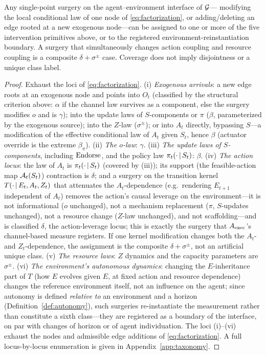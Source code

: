 \begin{proposition}
\label{thm:taxonomy-completeness}
Any single-point surgery on the agent--environment interface of $\mathcal{G}$---
modifying the local conditional law of one node of \eqref{eq:factorization},
or adding/deleting an edge rooted at a new exogenous node---can be assigned
to one or more of the five intervention primitives above, or to the
registered environment-reinstantiation boundary. A surgery that
simultaneously changes action coupling and resource coupling is a composite
$\delta+\sigma^{\pm}$ case. Coverage does not imply disjointness or a unique
class label.
\end{proposition}
\begin{proof}[Proof]
Exhaust the loci of \eqref{eq:factorization}. (i) \emph{Exogenous arrivals}: a
new edge roots at an exogenous node and points into $O_t$ (classified by the
structural criterion above: $\alpha$ if the channel law survives as a
component, else the surgery modifies $o$ and is $\gamma$); into the update
laws of $S$-components or $\pi$ ($\beta$, parameterized by the exogenous
source); into the $Z$-law ($\sigma^{\pm}$); or into $A_t$ directly, bypassing
$S$---a modification of the effective conditional law of $A_t$ given $S_t$,
hence $\beta$ (actuator override is the extreme $\beta_\pi$). (ii) \emph{The
$o$-law}: $\gamma$. (iii) \emph{The update laws of $S$-components},
including $\mathrm{Endorse}$, and the policy law $\pi_t(\cdot\,|\, S_t)$: $\beta$.
(iv) \emph{The action locus}: the law of $A_t$ is $\pi_t(\cdot\,|\, S_t)$
(covered by (iii)); its support (the feasible-action map
$\mathcal{A}_t(S_t)$) contraction is $\delta$; and a surgery on the transition
kernel $T(\cdot\,|\, E_t,A_t,Z_t)$ that attenuates the $A_t$-dependence
(e.g.\ rendering $E_{t+1}$ independent of $A_t$) removes the action's causal
leverage on the environment---it is not informational ($o$ unchanged), not a
mechanism replacement ($\pi$, $S$-updates unchanged), not a resource change
($Z$-law unchanged), and not scaffolding---and is classified $\delta$, the
action-leverage locus; this is exactly the surgery that $A_{\mathrm{exec}}$'s
channel-based measure registers. If one kernel modification changes both the
$A_t$- and $Z_t$-dependence, the assignment is the composite
$\delta+\sigma^{\pm}$, not an artificial unique class. (v) \emph{The resource
laws}: $Z$ dynamics and the capacity parameters are $\sigma^{\pm}$.
(vi) \emph{The environment's
autonomous dynamics}: changing the $E$-inheritance part of $T$ (how $E$
evolves given $E$, at fixed action and resource dependence) changes the
reference environment itself, not an influence on the agent; since autonomy
is defined \emph{relative to} an environment and a horizon
(Definition~\ref{def:autonomy}), such surgeries re-instantiate the
measurement rather than constitute a sixth class---they are registered as a
boundary of the interface, on par with changes of horizon or of agent
individuation. The loci (i)--(vi) exhaust the nodes and admissible edge
additions of \eqref{eq:factorization}. A full locus-by-locus enumeration is
given in Appendix~\ref{app:taxonomy}.
\end{proof}
